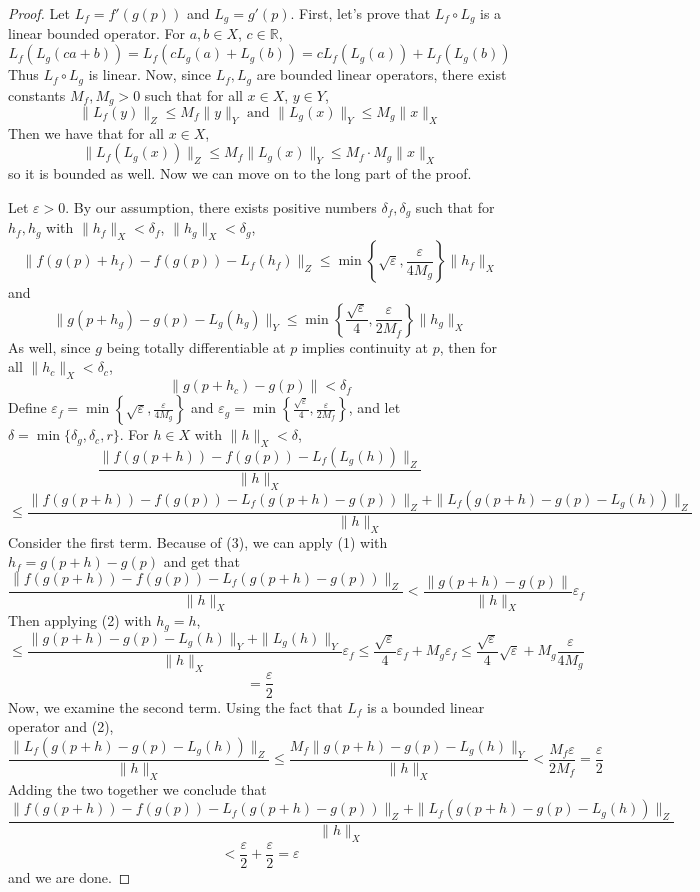 \documentclass{article}
\theoremstyle{plain} %
\numberwithin{thm}{section} %
\theoremstyle{definition}
\begin{document}
	\begin{proof}
		Let \(L_f = f'(g(p))\) and \(L_g = g'(p)\). First, let's prove that \(L_f \circ L_g\) is a linear bounded operator. For \(a,b \in X\), \(c \in \mathbb{R}\),
		\[
			L_f(L_g(ca + b)) = L_f(cL_g(a) + L_g(b)) = cL_f(L_g(a)) + L_f(L_g(b))
		\]
		Thus \(L_f \circ L_g\) is linear. Now, since \(L_f, L_g\) are bounded linear operators, there exist constants \(M_f, M_g > 0\) such that for all \(x \in X\), \(y \in Y\),
		\[
			\|L_f(y)\| _Z \leq M_f \|y\| _Y \text{ and } \|L_g(x)\| _Y \leq M_g \|x\| _X
		\]
		Then we have that for all \(x \in X\),
		\[
			\|L_f(L_g(x))\| _Z \leq M_f\|L_g(x)\| _Y \leq M_f \cdot M_g \|x\| _X
		\]
		so it is bounded as well. Now we can move on to the long part of the proof.
  
		Let \(\varepsilon > 0\). By our assumption, there exists positive numbers \(\delta _f , \delta _g\) such that for \(h_f, h_g\) with \(\|h_f\| _X < \delta _f\), \(\|h_g\| _X < \delta _g\),
		\[
			\|f(g(p) + h_f) - f(g(p)) - L_f(h_f)\| _Z \leq \min \left\{\sqrt{\varepsilon}, \frac{\varepsilon}{4M_g}\right\} \|h_f\| _X \tag{1}
		\]
		and
		\[
			\|g(p+h_g) - g(p) - L_g(h_g)\| _Y \leq \min \left\{\frac{\sqrt{\varepsilon}}{4}, \frac{\varepsilon}{2M_f}\right\} \|h_g\| _X \tag{2}
		\]
		As well, since \(g\) being totally differentiable at \(p\) implies continuity at \(p\), then for all \(\|h_c\| _X < \delta _c\),
		\[
			\|g(p + h_c) - g(p)\| < \delta _f \tag{3}
		\]
		Define \(\varepsilon _f = \min \left\{\sqrt{\varepsilon}, \frac{\varepsilon}{4M_g}\right\}\) and \(\varepsilon _g = \min \left\{\frac{\sqrt{\varepsilon}}{4}, \frac{\varepsilon}{2M_f}\right\}\), and let \(\delta = \min \{\delta_g, \delta_c, r\}\). For \(h \in X\) with \(\|h\| _X < \delta\),
		\[
			\frac{\|f(g(p+h)) - f(g(p)) - L_f(L_g(h))\| _Z}{\|h\| _X}
		\]	
		\[
			\leq \frac{\|f(g(p+h)) - f(g(p)) - L_f(g(p + h) - g(p))\| _Z + \|L_f(g(p+h) - g(p) - L_g(h))\| _Z}{\|h\| _X}
		\]
		Consider the first term. Because of (3), we can apply (1) with \(h_f = g(p + h) - g(p)\) and get that
		\[
			\frac{\|f(g(p+h)) - f(g(p)) - L_f(g(p + h) - g(p))\| _Z}{\|h\| _X} < \frac{\|g(p+h) - g(p)\|}{\|h\| _X}\varepsilon _f
		\]
		Then applying (2) with \(h_g = h\),
		\[
			\leq \frac{\|g(p+h) - g(p) - L_g(h)\| _Y + \|L_g(h)\| _Y}{\|h\| _X}\varepsilon _f \leq \frac{\sqrt{\varepsilon}}{4}\varepsilon _f + M_g \varepsilon _f \leq \frac{\sqrt{\varepsilon}}{4}\sqrt{\varepsilon} + M_g \frac{\varepsilon}{4 M_g}
		\]
		\[
			= \frac{\varepsilon}{2}
		\]
		Now, we examine the second term. Using the fact that \(L_f\) is a bounded linear operator and (2),
		\[
			\frac{\|L_f(g(p+h) - g(p) - L_g(h))\| _Z}{\|h\| _X} \leq \frac{M_f \|g(p+h) - g(p) - L_g(h)\| _Y}{\|h\| _X} < \frac{M_f \varepsilon}{2M_f} = \frac{\varepsilon}{2}
		\]
		Adding the two together we conclude that
		\[
			\frac{\|f(g(p+h)) - f(g(p)) - L_f(g(p + h) - g(p))\| _Z + \|L_f(g(p+h) - g(p) - L_g(h))\| _Z}{\|h\| _X}
		\] 
		\[
			< \frac{\varepsilon}{2} + \frac{\varepsilon}{2} = \varepsilon
		\]
		and we are done.

	\end{proof}
    
\end{document}
